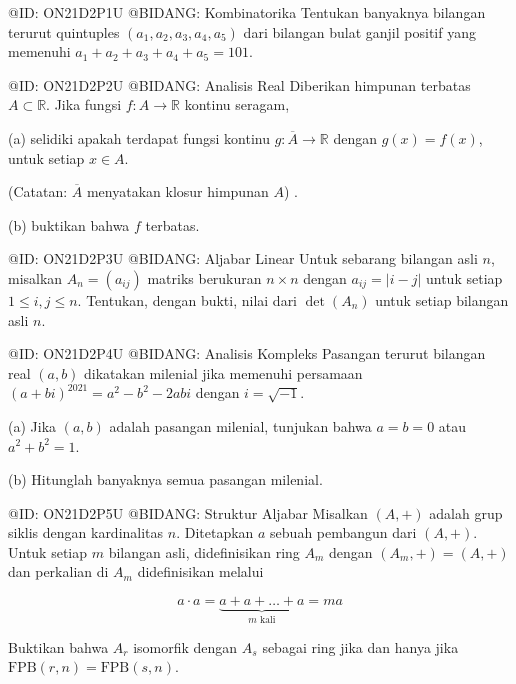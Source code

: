 @ID: ON21D2P1U
@BIDANG: Kombinatorika
Tentukan banyaknya bilangan terurut quintuples $(a_{1},a_{2},a_{3},a_{4},a_{5})$ dari bilangan bulat ganjil positif yang memenuhi $a_{1}+a_{2}+a_{3}+a_{4}+a_{5}=101$.

@ID: ON21D2P2U
@BIDANG: Analisis Real
Diberikan himpunan terbatas $A\subset\mathbb{R}$. Jika fungsi $f:A\rightarrow\mathbb{R}$ kontinu seragam,

(a) selidiki apakah terdapat fungsi kontinu $g:\overline{A}\rightarrow\mathbb{R}$ dengan $g(x)=f(x)$, untuk setiap $x\in A$.

(Catatan: $\overline{A}$ menyatakan klosur himpunan $A$) .

(b) buktikan bahwa $f$ terbatas.

@ID: ON21D2P3U
@BIDANG: Aljabar Linear
Untuk sebarang bilangan asli $n$, misalkan $A_{n}=(a_{ij})$ matriks berukuran $n\times n$ dengan $a_{ij}=|i-j|$ untuk setiap $1\le i, j\le n$. Tentukan, dengan bukti, nilai dari $\det(A_{n})$ untuk setiap bilangan asli $n$.

@ID: ON21D2P4U
@BIDANG: Analisis Kompleks
Pasangan terurut bilangan real $(a, b)$ dikatakan milenial jika memenuhi persamaan $(a+bi)^{2021}=a^{2}-b^{2}-2abi$ dengan $i=\sqrt{-1}$.

(a) Jika $(a, b)$ adalah pasangan milenial, tunjukan bahwa $a=b=0$ atau $a^{2}+b^{2}=1$.

(b) Hitunglah banyaknya semua pasangan milenial.

@ID: ON21D2P5U
@BIDANG: Struktur Aljabar
Misalkan $(A,+)$ adalah grup siklis dengan kardinalitas $n$. Ditetapkan $a$ sebuah pembangun dari $(A, +)$. Untuk setiap $m$ bilangan asli, didefinisikan ring $A_{m}$ dengan $(A_{m},+)=(A,+)$ dan perkalian di $A_{m}$ didefinisikan melalui

$$
a\cdot a=\underbrace{a+a+\dots+a}_{m \text{ kali}} = ma
$$

Buktikan bahwa $A_{r}$ isomorfik dengan $A_{s}$ sebagai ring jika dan hanya jika $\text{FPB}(r,n)=\text{FPB}(s,n)$.